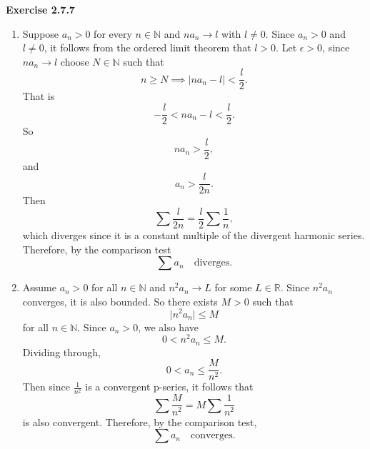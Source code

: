 \documentclass[12pt]{article}
\begin{document}
\textbf{Exercise 2.7.7}
\begin{enumerate}[label=(\alph*)]
    \item Suppose \( a_n > 0 \) for every \( n \in \mathbb{N} \) and \( n a_n \to l \) with \( l \neq 0 \).
          Since \( a_n > 0 \) and \( l \neq 0 \), it follows from the ordered limit theorem that
          \( l > 0 \). Let \( \epsilon > 0 \), since \( n a_n \to l \) choose \( N \in \mathbb{N} \) such that
          \[
              n \geq N \implies \vert n a_n - l \vert < \frac{l}{2}.
          \]
          That is
          \[
              -\frac{l}{2} < n a_n - l < \frac{l}{2}.
          \]
          So
          \[
              n a_n > \frac{l}{2},
          \]
          and
          \[
              a_n > \frac{l}{2n}.
          \]
          Then
          \[
              \sum \frac{l}{2n} = \frac{l}{2} \sum \frac{1}{n},
          \]
          which diverges since it is a constant multiple of the divergent harmonic series.
          Therefore, by the comparison test
          \[
              \sum a_n \quad \text{diverges.}
          \]

    \item Assume \( a_n > 0 \) for all \( n \in \mathbb{N} \) and \( n^2 a_n \to L\) for some \( L \in \mathbb{R} \).
          Since \( n^2 a_n \) converges, it is also bounded.
          So there exists \( M > 0 \) such that
          \[
              \vert n^2 a_n \vert \leq M
          \]
          for all \( n \in \mathbb{N} \).
          Since \( a_n > 0 \), we also have
          \[
              0 < n^2 a_n \leq M.
          \]
          Dividing through,
          \[
              0 < a_n \leq \frac{M}{n^2}.
          \]
          Then since \( \frac{1}{n^2} \) is a convergent p-series, it follows that
          \[
              \sum \frac{M}{n^2} = M \sum \frac{1}{n^2}
          \]
          is also convergent.
          Therefore, by the comparison test,
          \[
              \sum a_n \quad \text{converges.}
          \]

\end{enumerate}
\end{document}
